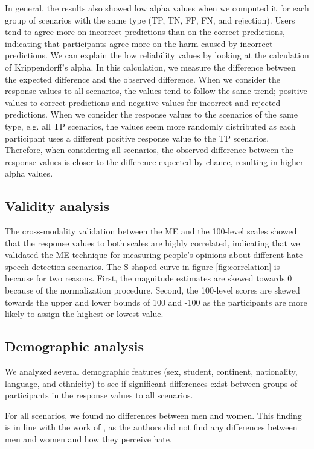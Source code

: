 %
In general, the results also showed low alpha values when we computed it for each group of scenarios with the same type (TP, TN, FP, FN, and rejection).
%
Users tend to agree more on incorrect predictions than on the correct predictions, indicating that participants agree more on the harm caused by incorrect predictions.
%
We can explain the low reliability values by looking at the calculation of Krippendorff's alpha.
%
In this calculation, we measure the difference between the expected difference and the observed difference.
%
When we consider the response values to all scenarios, the values tend to follow the same trend; positive values to correct predictions and negative values for incorrect and rejected predictions.
%
When we consider the response values to the scenarios of the same type, e.g. all TP scenarios, the values seem more randomly distributed as each participant uses a different positive response value to the TP scenarios.
%
Therefore, when considering all scenarios, the observed difference between the response values is closer to the difference expected by chance, resulting in higher alpha values.
%

%
\subsection{Validity analysis}
\label{sec:discussion-validity}
The cross-modality validation between the ME and the 100-level scales showed that the response values to both scales are highly correlated, indicating that we validated the ME technique for measuring people's opinions about different hate speech detection scenarios.
%
The S-shaped curve in figure \ref{fig:correlation} is because for two reasons.
%
First, the magnitude estimates are skewed towards 0 because of the normalization procedure.
%
Second, the 100-level scores are skewed towards the upper and lower bounds of 100 and -100 as the participants are more likely to assign the highest or lowest value.

\subsection{Demographic analysis}
\label{sec:discussion-demographic}
We analyzed several demographic features (sex, student, continent, nationality, language, and ethnicity) to see if significant differences exist between groups of participants in the response values to all scenarios.
%

%
For all scenarios, we found no differences between men and women.
%
This finding is in line with the work of \citet{gold2018women}, as the authors did not find any differences between men and women and how they perceive hate.
%

